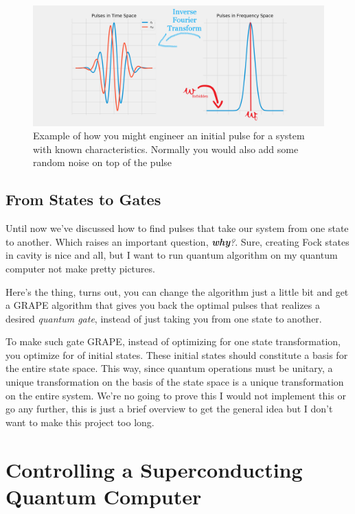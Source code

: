 \documentclass[english, a4paper, 12pt, twoside]{article}
\numberwithin{equation}{section} %
\begin{document}
\begin{figure}[H]
    \centering
    \includegraphics[width=1\columnwidth]{exaple-of-engineered-guess-edited.png}
    \caption{Example of how you might engineer an initial pulse for a system with known characteristics. Normally you would also add some random noise on top of the pulse}
    \label{fig:example-engineered-initial-guess}
\end{figure}
\subsection{From States to Gates}\label{sec:gate-GRAPE}
Until now we've discussed how to find pulses that take our system from one state to another. Which raises an important question, \textit{\textbf{why}?}. Sure, creating Fock states in cavity is nice and all, but I want to run quantum algorithm on my quantum computer not make pretty pictures.

Here's the thing, turns out, you can change the algorithm just a little bit and get a GRAPE algorithm that gives you back the optimal pulses that realizes a desired \textit{quantum gate}, instead of just taking you from one state to another. 

To make such gate GRAPE, instead of optimizing for one state transformation, you optimize for of initial states. These initial states should constitute a basis for the entire state space. This way, since quantum operations must be unitary, a unique transformation on the basis of the state space is a unique transformation on the entire system. We're no going to prove this I would not implement this or go any further, this is just a brief overview to get the general idea but I don't want to make this project too long.


\newpage
\section{Controlling a Superconducting Quantum Computer} \label{chap:FPGA}
\end{document}
